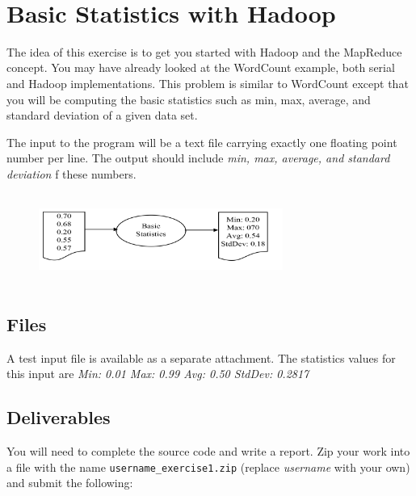 \FILENAME\

\section*{Basic Statistics with Hadoop}       

The idea of this exercise is to get you started with Hadoop and the
MapReduce concept. You may have already looked at the WordCount
example, both serial and Hadoop implementations. This problem is
similar to WordCount except that you will be computing the basic
statistics such as min, max, average, and standard deviation of a
given data set.

The input to the program will be a text file carrying exactly one
floating point number per line. The output should include \textit{min,
  max, average, and standard deviation} f these numbers.

\begin{figure}[!htbp]
\includegraphics[width=8cm,height=3cm]{section/icloud/assignment/exercise1/p1example.png}
\centering
\end{figure}

\subsection*{Files}

A test input file is available as a separate attachment.  The
statistics values for this input are \textit{Min: 0.01 Max: 0.99 Avg:
  0.50 StdDev: 0.2817}


\subsection*{Deliverables}

You will need to complete the source code and write a report. Zip your
work into a file with the name \verb|username_exercise1.zip| (replace
\textit{username} with your own) and submit the following:

